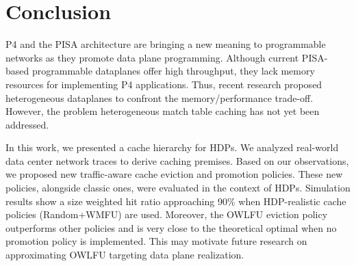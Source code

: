 \section{Conclusion}\label{sec:conclusion}

P4 and the PISA architecture are bringing a new meaning to programmable networks as they promote data plane programming.
Although current PISA-based programmable dataplanes offer high throughput, they lack memory resources for implementing P4 applications.
Thus, recent research proposed heterogeneous dataplanes to confront the memory/performance trade-off.
However, the problem heterogeneous match table caching has not yet been addressed.

In this work, we presented a cache hierarchy for HDPs.
We analyzed real-world data center network traces to derive caching premises.
Based on our observations, we proposed new traffic-aware cache eviction and promotion policies.
These new policies, alongside classic ones, were evaluated in the context of HDPs.
Simulation results show a size weighted hit ratio approaching 90\% when HDP-realistic cache policies (Random+WMFU) are used.
Moreover, the OWLFU eviction policy outperforms other policies and is very close to the theoretical optimal when no promotion policy is implemented.
This may motivate future research on approximating OWLFU targeting data plane realization.